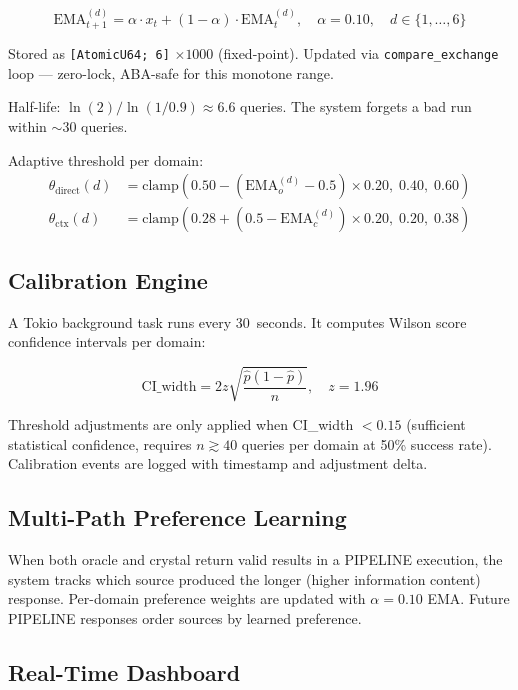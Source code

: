 \documentclass[12pt,a4paper]{article}
\begin{document}
\begin{equation}
\text{EMA}_{t+1}^{(d)} = \alpha \cdot x_t + (1-\alpha) \cdot \text{EMA}_t^{(d)},
\quad \alpha = 0.10,\quad d \in \{1,\ldots,6\}
\end{equation}

Stored as \texttt{[AtomicU64; 6]} $\times 1000$ (fixed-point). Updated via
\texttt{compare\_exchange} loop --- zero-lock, ABA-safe for this monotone range.

Half-life: $\ln(2) / \ln(1/0.9) \approx 6.6$ queries.
The system forgets a bad run within $\sim$30 queries.

Adaptive threshold per domain:
\begin{align}
\theta_{\text{direct}}(d) &= \text{clamp}\!\left(0.50 - (\text{EMA}_o^{(d)} - 0.5)\times 0.20,\; 0.40,\; 0.60\right) \\
\theta_{\text{ctx}}(d) &= \text{clamp}\!\left(0.28 + (0.5 - \text{EMA}_c^{(d)})\times 0.20,\; 0.20,\; 0.38\right)
\end{align}

\subsection{Calibration Engine}

A Tokio background task runs every 30~seconds. It computes Wilson score
confidence intervals per domain:

\begin{equation}
\text{CI\_width} = 2z\sqrt{\frac{\hat{p}(1-\hat{p})}{n}},\quad z=1.96
\end{equation}

Threshold adjustments are only applied when CI\_width $< 0.15$ (sufficient
statistical confidence, requires $n \gtrsim 40$ queries per domain at 50\%
success rate). Calibration events are logged with timestamp and adjustment delta.

\subsection{Multi-Path Preference Learning}

When both oracle and crystal return valid results in a PIPELINE execution,
the system tracks which source produced the longer (higher information content)
response. Per-domain preference weights are updated with $\alpha=0.10$ EMA.
Future PIPELINE responses order sources by learned preference.

\subsection{Real-Time Dashboard}
\end{document}
